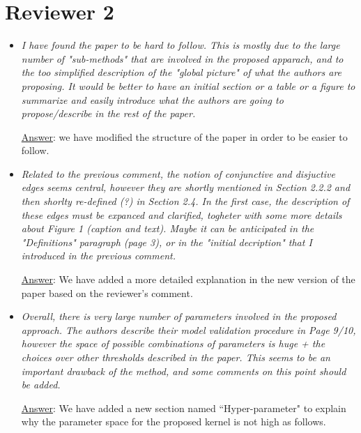 \documentclass[11pt]{article}
\begin{document}
\section{Reviewer 2}
\begin{itemize}
\item \textit{I have found the paper to be hard to follow. This is mostly due to the large number of "sub-methods" that are involved in the proposed apparach, and to the too simplified description of the "global picture" of what the authors are proposing. It would be better to have an initial section or a table or a figure to summarize and easily introduce what the authors are going to propose/describe in the rest of the paper.}

\underline{Answer}: we have modified the structure of the paper in order to be easier to follow.

\item \textit{Related to the previous comment, the notion of conjunctive and disjuctive edges seems central, however they are shortly mentioned in Section 2.2.2 and then shorlty re-defined (?) in Section 2.4. In the first case, the description of these edges must be expanced and clarified, togheter with some more details about Figure 1 (caption and text). Maybe it can be anticipated in the "Definitions" paragraph (page 3), or in the "initial decription" that I introduced in the previous comment.}

\underline{Answer}: We have added a more detailed explanation in the new version of the paper based on the reviewer's comment.

\item \textit{Overall, there is very large number of parameters involved in the proposed approach. The authors describe their model validation procedure in Page 9/10, however the space of possible combinations of parameters is huge + the choices over other thresholds described in the paper. This seems to be an important drawback of the method, and some comments on this point should be added.}

\underline{Answer}: We have added a new section named ``Hyper-parameter" to explain why the parameter space for the proposed kernel is not high as follows.\\


\end{itemize}
\end{document}
